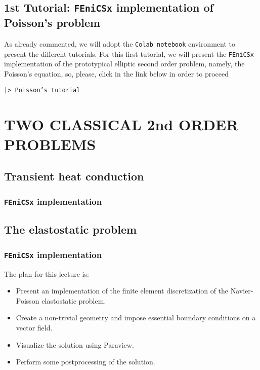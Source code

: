 \section{1st Tutorial: \texttt{FEniCSx} implementation of Poisson's problem}

As already commented, we will adopt the \texttt{Colab notebook} environment
to present the different tutorials. For this first tutorial, 
we will present the \texttt{FEniCSx} implementation
of the prototypical elliptic second order problem, namely, the Poisson's 
equation, so, please, click in the link below in order to proceed

 \href{https://github.com/IgorBaratta/FEniCSxCourse/tree/ICMC23/Problem1_Poisson}{\texttt{|> Poisson's tutorial}}

\setchapterpreamble[u]{\margintoc}
\chapter{TWO CLASSICAL 2nd ORDER PROBLEMS}

\section{Transient heat conduction}

\subsection{\texttt{FEniCSx} implementation}

\section{The elastostatic problem}

\subsection{\texttt{FEniCSx} implementation}


\iffalse

The plan for this lecture is:

\begin{itemize}
\item Present an implementation of the finite element discretization
of the Navier-Poisson elastostatic problem.
\item Create a non-trivial geometry and impose essential boundary conditions
on a vector field.
\item Visualize the solution using Paraview.
\item Perform some postprocessing of the solution.
\end{itemize}


